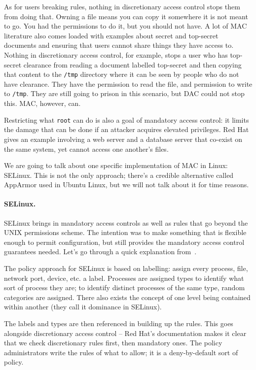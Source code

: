 As for users breaking rules, nothing in discretionary access control stops them from doing that. Owning a file means you can copy it somewhere it is not meant to go. You had the permissions to do it, but you should not have. A lot of MAC literature also comes loaded with examples about secret and top-secret documents and ensuring that users cannot share things they have access to. Nothing in discretionary access control, for example, stops a user who has top-secret clearance from reading a document labelled top-secret and then copying that content to the \texttt{/tmp} directory where it can be seen by people who do not have clearance. They have the permission to read the file, and permission to write to \texttt{/tmp}. They are still going to prison in this scenario, but DAC could not stop this. MAC, however, can. 

Restricting what \texttt{root} can do is also a goal of mandatory access control: it limits the damage that can be done if an attacker acquires elevated privileges. Red Hat gives an example involving a web server and a database server that co-exist on the same system, yet cannot access one another's files. 

We are going to talk about one specific implementation of MAC in Linux: SELinux. This is not the only approach; there's a credible alternative called AppArmor used in Ubuntu Linux, but we will not talk about it for time reasons. 

\paragraph{SELinux.} SELinux brings in mandatory access controls as well as rules that go beyond the UNIX permissions scheme. The intention was to make something that is flexible enough to permit configuration, but still provides the mandatory access control guarantees needed. Let's go through a quick explanation from~\cite{selinux}.

The policy approach for SELinux is based on labelling: assign every process, file, network port, device, etc. a label. Processes are assigned types to identify what sort of process they are; to identify distinct processes of the same type, random categories are assigned. There also exists the concept of one level being contained within another (they call it dominance in SELinux).

The labels and types are then referenced in building up the rules. This goes alongside discretionary access control -- Red Hat's documentation makes it clear that we check discretionary rules first, then mandatory ones. The policy administrators write the rules of what to allow; it is a deny-by-default sort of policy. 

